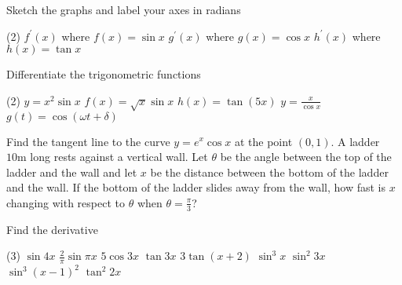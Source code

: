 \begin{Exercise}[title={Standard Derivatives},label=exStandardDerivatives]
\Question Sketch the graphs and label your axes in radians
	\begin{tasks}(2)
	\task $f^{ \prime } (x)$ where $f (x) =\sin  x$ %
	\task $g^{ \prime } (x)$ where $g (x) =\cos  x$  %
	\task $h^{ \prime } (x)$ where $h (x)  =\tan x$  %
\end{tasks}

\Question Differentiate the trigonometric functions
\begin{tasks}(2)
	\task $y =x^{2} \sin  x$ %
	\task $f (x) =\sqrt{x} \sin  x$ %
	\task $h (x) =\tan  (5 x)$ %
	\task $y =\frac{x}{\cos  x}$ %
	\task $g (t) =\cos  (\omega  t +\delta )$ %
\end{tasks}

\Question Find the tangent line to the curve $y =e^{x} \cos  x$ at the point $(0 ,1)$. %
\Question A ladder $10 \mbox{m}$ long rests against a vertical wall. Let $\theta $ be the angle between the top of the ladder and the wall and let $x$ be the distance between the bottom of the ladder and the wall. If the bottom of the ladder slides away from the wall, how fast is $x$ changing with respect to $\theta $ when $\theta  =\frac{\pi }{3}$? %

	\Question Find the derivative
\begin{tasks}(3)
	\task  $\sin  4 x$ %
	\task $\frac{2}{\pi } \sin  \pi  x$ %
	\task $5 \cos  3 x$ %
	\task $\tan  3 x$ 	%
	\task $3 \tan  \left (x +2\right )$  %
	\task $\sin ^{3} x$ %
	\task $\sin ^{2} 3 x$ %
	\task $\sin ^{3} \left (x -1\right )^{2}$ %
	\task $\tan ^{2} 2 x$ %
	
\end{tasks}

\end{Exercise}
